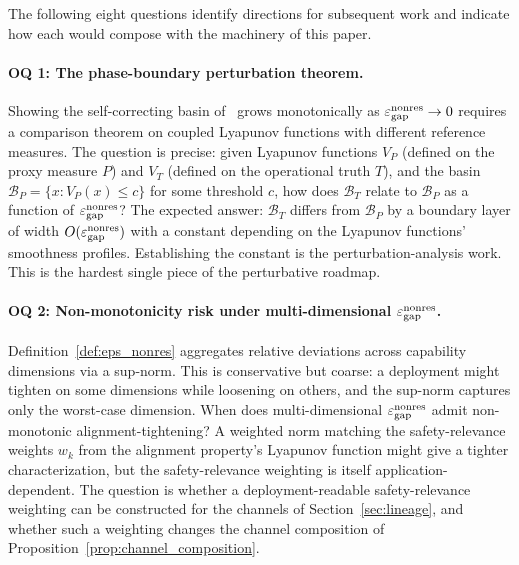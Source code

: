 The following eight questions identify directions for
subsequent work and indicate how each would compose with the
machinery of this paper.

\paragraph{OQ 1: The phase-boundary perturbation theorem.}
\label{oq:phase_boundary}
Showing the self-correcting basin
of~\citep[Theorem~1]{lasser2026phase} grows monotonically as
$\varepsilon_{\mathrm{gap}}^{\mathrm{nonres}} \to 0$ requires a comparison theorem on coupled
Lyapunov functions with different reference measures.  The
question is precise: given Lyapunov functions
$V_P$ (defined on the proxy measure $P$) and $V_T$ (defined on
the operational truth $T$), and the basin
$\mathcal{B}_P = \{x : V_P(x) \leq c\}$ for some threshold $c$,
how does $\mathcal{B}_T$ relate to $\mathcal{B}_P$ as a
function of $\varepsilon_{\mathrm{gap}}^{\mathrm{nonres}}$?  The expected answer: $\mathcal{B}_T$
differs from $\mathcal{B}_P$ by a boundary layer of width
$O(\varepsilon_{\mathrm{gap}}^{\mathrm{nonres}})$ with a constant depending on the Lyapunov
functions' smoothness profiles.  Establishing the constant is
the perturbation-analysis work.  This is the hardest single
piece of the perturbative roadmap.

\paragraph{OQ 2: Non-monotonicity risk under multi-dimensional
$\varepsilon_{\mathrm{gap}}^{\mathrm{nonres}}$.}
\label{oq:nonmonotonicity}
Definition~\ref{def:eps_nonres} aggregates relative deviations
across capability dimensions via a sup-norm.  This is
conservative but coarse: a deployment might tighten on some
dimensions while loosening on others, and the sup-norm captures
only the worst-case dimension.  When does multi-dimensional
$\varepsilon_{\mathrm{gap}}^{\mathrm{nonres}}$ admit non-monotonic alignment-tightening?  A
weighted norm matching the safety-relevance weights $w_k$ from
the alignment property's Lyapunov function might give a
tighter characterization, but the safety-relevance weighting is
itself application-dependent.  The question is whether a
deployment-readable safety-relevance weighting can be constructed
for the channels of Section~\ref{sec:lineage}, and whether such a
weighting changes the channel composition of
Proposition~\ref{prop:channel_composition}.

